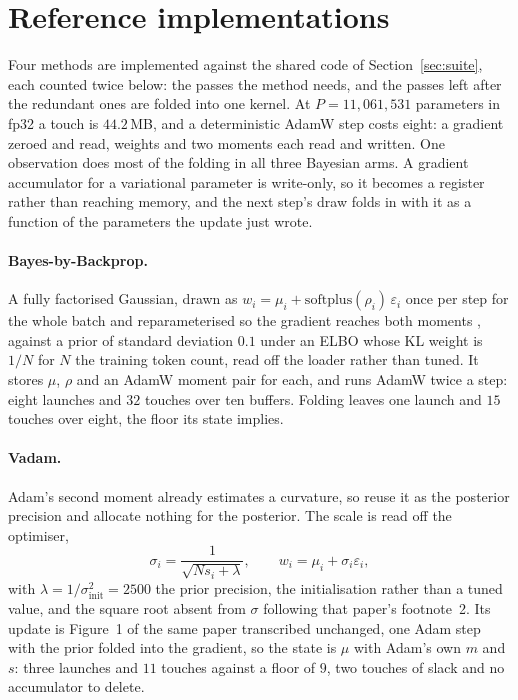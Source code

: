 \section{Reference implementations}
\label{sec:arms}


Four methods are implemented against the shared code of Section~\ref{sec:suite},
each counted twice below: the passes the method needs, and the passes left after the
redundant ones are folded into one kernel. At $P = 11{,}061{,}531$ parameters in fp32
a touch is $44.2$\,MB, and a deterministic AdamW step costs eight: a gradient zeroed
and read, weights and two moments each read and written. One observation does most of
the folding in all three Bayesian arms. A gradient accumulator for a variational
parameter is write-only, so it becomes a register rather than reaching memory, and
the next step's draw folds in with it as a function of the parameters the update just
wrote.

\paragraph{Bayes-by-Backprop.}
A fully factorised Gaussian, drawn as $w_i = \mu_i +
\mathrm{softplus}(\rho_i)\,\varepsilon_i$ once per step for the whole batch and
reparameterised so the gradient reaches both moments
\citep{kingma2014autoencoding,blundell2015weight}, against a prior of standard
deviation $0.1$ under an ELBO whose KL weight is $1/N$ for $N$ the training token
count, read off the loader rather than tuned. It stores $\mu$, $\rho$ and an AdamW
moment pair for each, and runs AdamW twice a step: eight launches and $32$ touches
over ten buffers. Folding leaves one launch and $15$ touches over eight, the floor
its state implies.

\paragraph{Vadam.}
Adam's second moment already estimates a curvature, so \citet{khan2018vadam} reuse
it as the posterior precision and allocate nothing for the posterior. The scale is
read off the optimiser,
\begin{equation}
  \sigma_i = \frac{1}{\sqrt{N s_i + \lambda}} ,
  \qquad
  w_i = \mu_i + \sigma_i \varepsilon_i ,
  \label{eq:vadam-sigma}
\end{equation}
with $\lambda = 1/\sigma_{\text{init}}^{2} = 2500$ the prior precision, the
initialisation rather than a tuned value, and the square root absent from $\sigma$
following that paper's footnote~2. Its update is Figure~1 of the same paper
transcribed unchanged, one Adam step with the prior folded into the gradient, so the
state is $\mu$ with Adam's own $m$ and $s$: three launches and $11$ touches against a
floor of $9$, two touches of slack and no accumulator to delete.

